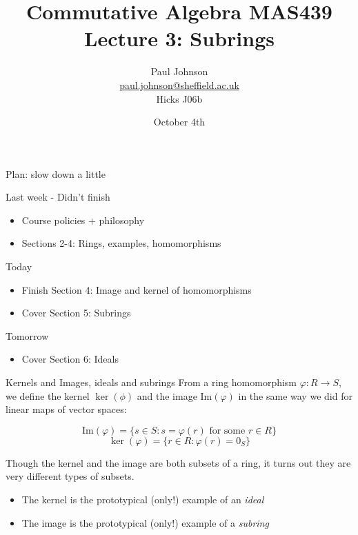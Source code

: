 \documentclass{beamer}
\title{Commutative Algebra MAS439 \\ Lecture 3: Subrings}
\author{Paul Johnson \\ \href{mailto:paul.johnson@sheffield.ac.uk}{paul.johnson@sheffield.ac.uk} \\ Hicks J06b}
\date{October 4th}
\begin{document}
\begin{frame}
\titlepage
\end{frame}

\begin{frame}{Plan: slow down a little}

  \begin{block}{Last week - Didn't finish}
    \begin{itemize}
\item Course policies + philosophy
    \item  Sections 2-4: Rings, examples, homomorphisms
\end{itemize}
  \end{block}
  \begin{block}{Today}
\begin{itemize}
\item    Finish Section 4: Image and kernel of homomorphisms
\item    Cover Section 5: Subrings
\end{itemize}
\end{block}
\begin{block}{Tomorrow}
  \begin{itemize}
    \item Cover Section 6: Ideals
\end{itemize}
  \end{block}
\end{frame}



\begin{frame}{Kernels and Images, ideals and subrings}
  From a ring homomorphism $\varphi:R\to S$, we define the kernel $\ker(\phi)$ and the image $\text{Im}(\varphi)$ in the same way we did for linear maps of vector spaces:

  $$\text{Im}(\varphi)=\{s\in S : s=\varphi(r) \text{ for some } r\in R\}$$
    $$\ker(\varphi)=\{r\in R : \varphi(r)=0_S\}$$

Though the kernel and the image are both subsets of a ring, it turns out they are very different types of subsets.

\begin{itemize}
\item The kernel is the prototypical (only!) example of an \emph{ideal}
  \item The image is the prototypical (only!) example of a \emph{subring}
\end{itemize}
\end{frame}
\end{document}
